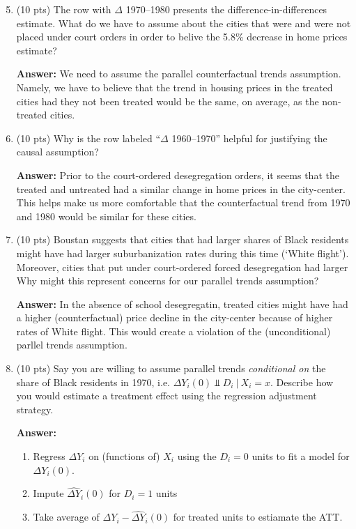 \documentclass[12pt]{article}
\newcommand{\answer}[1]{{\color{blue_winged_teal}\textbf{Answer:} #1}}
\newcommand{\pts}[1]{{\color{zinc500}(#1 pts)}}
\begin{document}
\bigskip
\begin{enumerate}
  \setcounter{enumi}{4}
  \item \pts{10} The row with $\Delta$ 1970--1980 presents the difference-in-differences estimate. 
  What do we have to assume about the cities that were and were not placed under court orders in order to belive the 5.8\% decrease in home prices estimate?
  
  \answer{
    We need to assume the parallel counterfactual trends assumption.
    Namely, we have to believe that the trend in housing prices in the treated cities had they not been treated would be the same, on average, as the non-treated cities.
  }

  \medskip
  \item \pts{10} Why is the row labeled ``$\Delta$ 1960--1970'' helpful for justifying the causal assumption?
  
  \answer{
    Prior to the court-ordered desegregation orders, it seems that the treated and untreated had a similar change in home prices in the city-center.
    This helps make us more comfortable that the counterfactual trend from 1970 and 1980 would be similar for these cities.
  }

  \medskip
  \item \pts{10} Boustan suggests that cities that had larger shares of Black residents might have had larger suburbanization rates during this time (`White flight'). 
  Moreover, cities that put under court-ordered forced desegregation had larger 
  Why might this represent concerns for our parallel trends assumption?

  \answer{
    In the absence of school desegregatin, treated cities might have had a higher (counterfactual) price decline in the city-center because of higher rates of White flight. 
    This would create a violation of the (unconditional) parllel trends assumption.
  }

  \medskip
  \item \pts{10} Say you are willing to assume parallel trends \emph{conditional on} the share of Black residents in 1970, i.e. $\Delta Y_i(0) \Perp D_i \ \vert \ X_i = x$.
  Describe how you would estimate a treatment effect using the regression adjustment strategy. 

  \answer{
    \begin{enumerate}
      \item Regress $\Delta Y_i$ on (functions of) $X_i$ using the $D_i = 0$ units to fit a model for $\Delta Y_i(0)$.
      
      \item Impute $\widehat{\Delta Y}_i(0)$ for $D_i = 1$ units
      
      \item Take average of $\Delta Y_i - \widehat{\Delta Y}_i(0)$ for treated units to estiamate the ATT.
    \end{enumerate}
  }
\end{enumerate}
\end{document}
